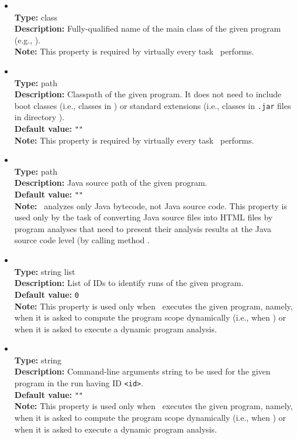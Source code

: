 \begin{itemize}
\item
{} \\
{\bf Type:} class \\
{\bf Description:} Fully-qualified name of the main class of the given program (e.g., ). \\
{\bf Note:} This property is required by virtually every task \Chord\ performs.

\item
{} \\
{\bf Type:} path \\
{\bf Description:} Classpath of the given program.  It does not need to include boot classes (i.e., classes in ) or standard extensions (i.e., classes in {\tt .jar} files in directory ). \\
{\bf Default value:} {\tt ""} \\
{\bf Note:} This property is required by virtually every task \Chord\ performs.

\item
{} \\
{\bf Type:} path \\
{\bf Description:} Java source path of the given program. \\
{\bf Default value:} {\tt ""}  \\
{\bf Note:} \Chord\ analyzes only Java bytecode, not Java source code.  This property is used only by the task of converting Java source files into HTML files by program analyses that need to present their analysis results at the Java source code level (by calling method .

\item
{} \\
{\bf Type:} string list \\
{\bf Description:} List of IDs to identify runs of the given program. \\
{\bf Default value:} {\tt 0} \\
{\bf Note:} This property is used only when \Chord\ executes the given program, namely, when it is asked to compute the program scope dynamically (i.e., when ) or when it is asked to execute a dynamic program analysis.

\item
{} \\
{\bf Type:} string \\
{\bf Description:} Command-line arguments string to be used for the given program in the run having ID {\tt <id>}. \\
{\bf Default value:} {\tt ""} \\
{\bf Note:} This property is used only when \Chord\ executes the given program, namely, when it is asked to compute the program scope dynamically (i.e., when ) or when it is asked to execute a dynamic program analysis.


\end{itemize}
